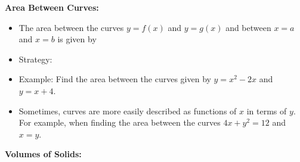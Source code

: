 \documentclass[12pt,letterpaper]{article}
\begin{document}
\noindent\textbf{Area Between Curves:}

\begin{itemize}

\item The area between the curves $y = f(x)$ and $y = g(x)$ and between $x = a$ and $x=b$ is given by %

\bigskip

\item Strategy: 


\bigskip\bigskip\bigskip

\item Example: Find the area between the curves given by $y = x^2 - 2x$ and $y = x+4$.

\newpage

\item Sometimes, curves are more easily described as functions of $x$ in terms of $y$. For example, when finding the area between the curves $4x+y^2 = 12$ and $x = y$. %

\vspace{2in}



\end{itemize}











\noindent\textbf{Volumes of Solids:}
\end{document}
